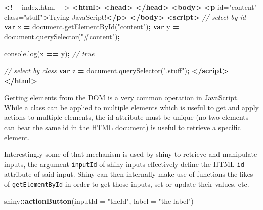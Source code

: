 \documentclass[
]{krantz}
\makeatletter
\newenvironment{Shaded}{\begin{snugshade}}{\end{snugshade}}
\newcommand{\AttributeTok}[1]{\textcolor[rgb]{0.61,0.61,0.61}{#1}}
\newcommand{\CommentTok}[1]{\textcolor[rgb]{0.37,0.37,0.37}{\textit{#1}}}
\newcommand{\DataTypeTok}[1]{\textcolor[rgb]{0.27,0.27,0.27}{#1}}
\newcommand{\ErrorTok}[1]{\textcolor[rgb]{0.14,0.14,0.14}{\textbf{#1}}}
\newcommand{\KeywordTok}[1]{\textcolor[rgb]{0.27,0.27,0.27}{\textbf{#1}}}
\newcommand{\NormalTok}[1]{#1}
\newcommand{\OperatorTok}[1]{\textcolor[rgb]{0.43,0.43,0.43}{\textbf{#1}}}
\newcommand{\OtherTok}[1]{\textcolor[rgb]{0.37,0.37,0.37}{#1}}
\newcommand{\StringTok}[1]{\textcolor[rgb]{0.5,0.5,0.5}{#1}}
\newcommand{\VariableTok}[1]{\textcolor[rgb]{0,0,0}{#1}}
\newenvironment{kframe}{%
\medskip{}
\setlength{\fboxsep}{.8em}
 \def\at@end@of@kframe{}%
 \ifinner\ifhmode%
  \def\at@end@of@kframe{\end{minipage}}%
  \begin{minipage}{\columnwidth}%
 \fi\fi%
 \def\FrameCommand##1{\hskip\@totalleftmargin \hskip-\fboxsep
 \colorbox{shadecolor}{##1}\hskip-\fboxsep
     \hskip-\linewidth \hskip-\@totalleftmargin \hskip\columnwidth}%
 \MakeFramed {\advance\hsize-\width
   \@totalleftmargin\z@ \linewidth\hsize
   \@setminipage}}%
 {\par\unskip\endMakeFramed%
 \at@end@of@kframe}
\renewenvironment{Shaded}{\begin{kframe}}{\end{kframe}}
\makeatother
\begin{document}
\begin{Shaded}
\begin{Highlighting}[]
 \ErrorTok{<}\NormalTok{!–– index.html ––>}
\KeywordTok{<html>}
  \KeywordTok{<head>}
  \KeywordTok{</head>}
  \KeywordTok{<body>}
    \KeywordTok{<p}\OtherTok{ id=}\StringTok{"content"}\OtherTok{ class=}\StringTok{"stuff"}\KeywordTok{>}\NormalTok{Trying JavaScript!}\KeywordTok{</p>}
  \KeywordTok{</body>}
  \KeywordTok{<script>}
    \CommentTok{// select by id}
    \KeywordTok{var}\NormalTok{ x }\OperatorTok{=} \VariableTok{document}\NormalTok{.}\AttributeTok{getElementById}\NormalTok{(}\StringTok{"content"}\NormalTok{)}\OperatorTok{;}
    \KeywordTok{var}\NormalTok{ y }\OperatorTok{=} \VariableTok{document}\NormalTok{.}\AttributeTok{querySelector}\NormalTok{(}\StringTok{"\#content"}\NormalTok{)}\OperatorTok{;}

    \VariableTok{console}\NormalTok{.}\AttributeTok{log}\NormalTok{(x }\OperatorTok{==}\NormalTok{ y)}\OperatorTok{;} \CommentTok{// true}

    \CommentTok{// select by class}
    \KeywordTok{var}\NormalTok{ z }\OperatorTok{=} \VariableTok{document}\NormalTok{.}\AttributeTok{querySelector}\NormalTok{(}\StringTok{".stuff"}\NormalTok{)}\OperatorTok{;}
  \KeywordTok{</script>}
\KeywordTok{</html>}
\end{Highlighting}
\end{Shaded}

Getting elements from the DOM is a very common operation in JavaScript. While a class can be applied to multiple elements which is useful to get and apply actions to multiple elements, the id attribute must be unique (no two elements can bear the same id in the HTML document) is useful to retrieve a specific element.

Interestingly some of that mechanism is used by shiny to retrieve and manipulate inputs, the argument \texttt{inputId} of shiny inputs effectively define the HTML \texttt{id} attribute of said input. Shiny can then internally make use of functions the likes of \texttt{getElementById} in order to get those inputs, set or update their values, etc.

\begin{Shaded}
\begin{Highlighting}[]
\NormalTok{shiny}\OperatorTok{::}\KeywordTok{actionButton}\NormalTok{(}\DataTypeTok{inputId =} \StringTok{"theId"}\NormalTok{, }\DataTypeTok{label =} \StringTok{"the label"}\NormalTok{) }
\end{Highlighting}
\end{Shaded}
\end{document}
